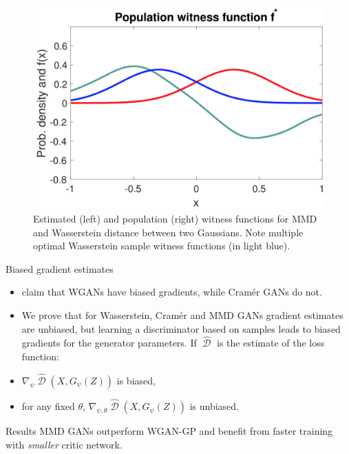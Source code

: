 \documentclass[xcolor={table}]{beamer}
\DeclareMathOperator{\D}{\mathcal{D}}
\begin{document}
\begin{frame}{}
\begin{columns}[T, totalwidth=\textwidth]
  \begin{column}{.32\textwidth}
    \begin{figure}
      \centering
        \includegraphics[width=1.1\columnwidth]{figs/witness.png}
      \caption{Estimated (left) and population (right) witness functions for MMD and Wasserstein distance between two Gaussians. Note multiple optimal Wasserstein sample witness functions (in light blue).}
    \end{figure}
    \vspace*{-1.3cm}
    \begin{block}{Biased gradient estimates}
      \begin{itemize}
        \item \citet{cramer-gan} claim that WGANs have biased gradients, while Cram\'er GANs do not.
        \item We prove that for Wasserstein, Cram\'er and MMD GANs gradient estimates
              are unbiased, but learning a discriminator based on samples leads to biased gradients 
              for the generator parameters. If $\widehat{\D}$ is the estimate of the loss function: 
        \item $\nabla_{\psi}\widehat{\D}(X, G_{\psi}(Z))$ is biased,
        \item for any fixed $\theta$, $\nabla_{\psi, \theta} \widehat{\D}(X, G_{\psi}(Z))$ is unbiased.
      \end{itemize}
    \end{block}
    \vspace*{-1.3cm}
    \begin{block}{Results}
      MMD GANs outperform WGAN-GP and benefit from faster training with \emph{smaller} critic network.

\end{block}
\end{column}
\end{columns}
\end{frame}
\end{document}
